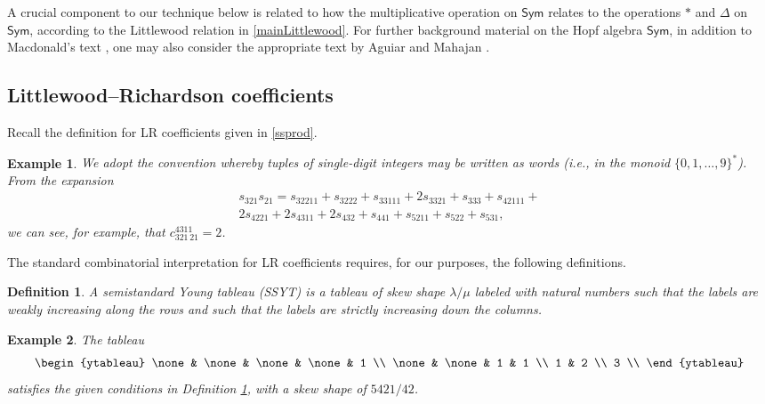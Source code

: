 \documentclass[12pt]{article}
\newtheorem{definition}{Definition}
\newtheorem{example}{Example}
\begin{document}
 A crucial component to our technique below is related to how the multiplicative operation on $\textsf{Sym}$ relates to the operations
 $\ast$ and $\Delta$ on $\textsf{Sym}$, according to the Littlewood relation in \eqref{mainLittlewood}. For further background material 
 on the Hopf algebra $\textsf{Sym}$, in addition to Macdonald's text \cite{Macdonald1995}, one may also consider the appropriate 
 text by Aguiar and Mahajan \cite{AguiarMahajan2010}. 

\subsection{Littlewood--Richardson coefficients}
 Recall the definition for LR coefficients given in \eqref{ssprod}. 

\begin{example}
 We adopt the convention whereby tuples of single-digit integers may be written as words (i.e., in the monoid $\{ 0, 1, \ldots, 
 9 \}^{\ast}$). From the expansion 
\begin{multline*}
 s_{321} s_{21} = s_{32211} + s_{3222} + s_{33111} + 2 s_{3321} + s_{333} + s_{42111} + \\ 
 2 s_{4221} + 2 s_{4311} + 2 s_{432} + s_{441} + s_{5211} + s_{522} + s_{531}, 
\end{multline*}
 we can see, for example, that $ c_{321 \, 21}^{4311} = 2$. 
\end{example}

 The standard combinatorial interpretation for LR coefficients requires, for our purposes, the following definitions. 

\begin{definition}\label{defineSSYT}
 A \emph{semistandard Young tableau (SSYT)} is a tableau of skew shape $\lambda / \mu$ labeled with natural numbers such that the 
 labels are weakly increasing along the rows and such that the labels are strictly increasing down the columns. 
\end{definition} 

\begin{example}
 The tableau
\begin{equation}\label{firstLRtab}
 \begin{ytableau}
 \none & \none & \none & \none & 1 \\
\none & \none & 1 & 1 \\
1 & 2 \\ 
 3 \\ 
\end{ytableau}
\end{equation}
 satisfies the given conditions in Definition \ref{defineSSYT}, with a skew shape of $5421/42$. 
\end{example}
\end{document}
